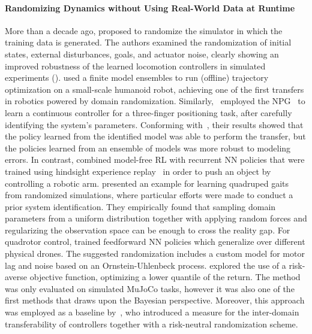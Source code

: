 \documentclass[utf8]{frontiersSCNS} %
\begin{document}
\paragraph*{Randomizing Dynamics without Using Real-World Data at Runtime}
%
More than a decade ago, \citet{Wang_Hertzmann_10} proposed to randomize the simulator in which the training data is generated.
The authors examined the randomization of initial states, external disturbances, goals, and actuator noise, clearly showing an improved robustness of the learned locomotion controllers in simulated experiments (\simtosim).
%
\citet{Mordatch_Todorov_15} used a finite model ensembles to run (offline) trajectory optimization on a small-scale humanoid robot, achieving one of the first \simtoreal transfers in robotics powered by domain randomization.
Similarly,~\citet{Lowrey_etal_2018} employed the \acl{NPG}~\citep{Kakade_2001} to learn a continuous controller for a three-finger positioning task, after carefully identifying the system's parameters.
Conforming with~\citet{Mordatch_Todorov_15}, their results showed that the policy learned from the identified model was able to perform the \simtoreal transfer, but the policies learned from an ensemble of models was more robust to modeling errors.
In contrast, \citet{Peng_Abbeel_18} combined model-free \ac{RL} with recurrent \ac{NN} policies that were trained using hindsight experience replay~\citep{Andrychowicz_Zaremba_17} in order to push an object by controlling a robotic arm.
%
\citet{Tan_Vanhoucke_18} presented an example for learning quadruped gaits from randomized simulations, where particular efforts were made to conduct a prior system identification.
They empirically found that sampling domain parameters from a uniform distribution together with applying random forces and regularizing the observation space can be enough to cross the reality gap.
%
For quadrotor control, \citet{Molchanov_Chen_Sukhatme_19} trained feedforward \ac{NN} policies which generalize over different physical drones.
The suggested randomization includes a custom model for motor lag and noise based on an Ornstein-Uhlenbeck process.
%
\citet{Rajeswaran_Levine_16} explored the use of a risk-averse objective function, optimizing a lower quantile of the return.
The method was only evaluated on simulated MuJoCo tasks, however it was also one of the first methods that draws upon the Bayesian perspective.
Moreover, this approach was employed as a baseline by~\citet{Muratore_Peters_21_PAMI}, who introduced a measure for the inter-domain transferability of controllers together with a risk-neutral randomization scheme.
\end{document}
